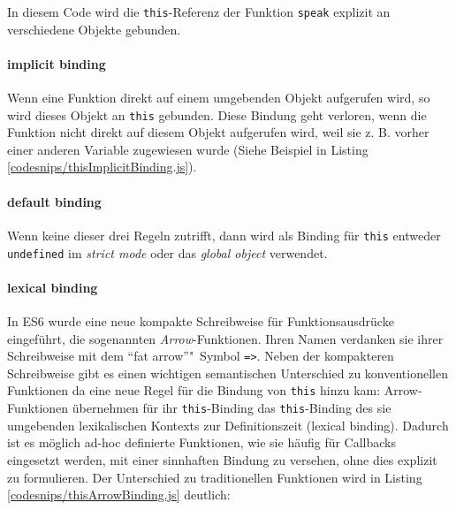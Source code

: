 
In diesem Code wird die \texttt{this}-Referenz der Funktion \texttt{speak} explizit an verschiedene Objekte gebunden. 

\paragraph{implicit binding} Wenn eine Funktion direkt auf einem umgebenden Objekt aufgerufen wird, so wird dieses Objekt an \texttt{this} gebunden. Diese Bindung geht verloren, wenn die Funktion nicht direkt auf diesem Objekt aufgerufen wird, weil sie z. B. vorher einer anderen Variable zugewiesen wurde (Siehe Beispiel in Listing \ref{codesnips/thisImplicitBinding.js}).

\paragraph{default binding} Wenn keine dieser drei Regeln zutrifft, dann wird als Binding für \texttt{this} entweder \texttt{undefined} im \emph{strict mode} oder das \emph{global object} verwendet.


\paragraph{lexical binding} In ES6 wurde eine neue kompakte Schreibweise für Funktionsausdrücke eingeführt, die sogenannten \emph{Arrow}-Funktionen. Ihren Namen verdanken sie ihrer Schreibweise mit dem "`fat arrow"'"~Symbol \texttt{=>}. Neben der kompakteren Schreibweise  gibt es einen wichtigen semantischen Unterschied zu konventionellen Funktionen da eine neue Regel für die Bindung von \texttt{this} hinzu kam: Arrow-Funktionen übernehmen für ihr \texttt{this}-Binding das \texttt{this}-Binding des sie umgebenden lexikalischen Kontexts zur Definitionszeit (lexical binding). Dadurch ist es möglich ad-hoc definierte Funktionen, wie sie häufig für Callbacks eingesetzt werden, mit einer sinnhaften Bindung zu versehen, ohne dies explizit zu formulieren. Der Unterschied zu traditionellen Funktionen wird in Listing \ref{codesnips/thisArrowBinding.js} deutlich:



